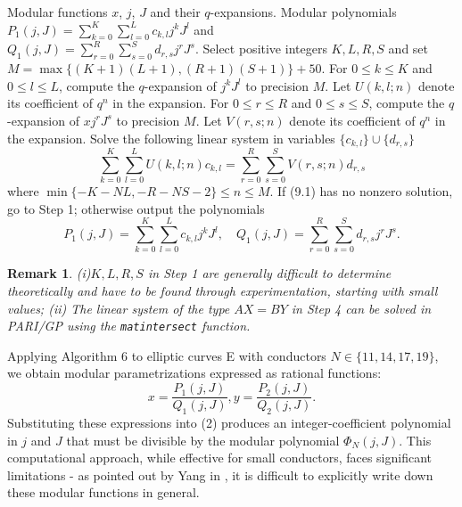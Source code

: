 \documentclass[10pt, a4paper]{article}
\newtheorem{remark}[theorem]{Remark}
\begin{document}
\begin{algorithm}[H]
\caption{Compute polynomials $P_1(j,J)$ and $Q_1(j,J)$ such that $x = \frac{P_1(j, J)}{Q_1(j, J)}$}
\begin{algorithmic}[1]
\REQUIRE  Modular functions $x$,  $j$, $J$ and their $q$-expansions.
\ENSURE Modular polynomials $P_1(j,J) = \sum_{k=0}^K \sum_{l=0}^L c_{k,l} j^k J^l$ and \\
\qquad\quad$Q_1(j,J) = \sum_{r=0}^R \sum_{s=0}^S d_{r,s} j^r J^s$.
\STATE  Select positive integers $K, L, R, S$ and set $M = \max\{(K+1)(L+1), (R+1)(S+1)\} + 50$.
\STATE For $0 \leq k \leq K$ and $0 \leq l \leq L$, compute the $q$-expansion of $j^k J^l$ to precision $M$. Let $U(k,l;n)$ denote its coefficient of $q^n$ in the expansion.
\STATE   For $0 \leq r \leq R$ and $0 \leq s \leq S$, compute the $q$-expansion of $xj^r J^s$ to precision $M$. Let $V(r,s;n)$ denote its coefficient of $q^n$ in the expansion.
\STATE  Solve the following  linear system in  variables $\{c_{k,l}\} \cup \{d_{r,s}\}$
\begin{equation}\sum_{k=0}^K \sum_{l=0}^L U(k,l;n)c_{k,l} = \sum_{r=0}^R \sum_{s=0}^S V(r,s;n)d_{r,s} \end{equation}
where $\min\{-K-NL, -R-NS-2\} \leq n \leq M$.
\STATE  If  (9.1)  has no nonzero solution, go to Step 1; otherwise
output the polynomials
\[ P_1(j,J) = \sum_{k=0}^K \sum_{l=0}^L c_{k,l} j^k J^l, \quad Q_1(j,J) = \sum_{r=0}^R \sum_{s=0}^S d_{r,s} j^r J^s. \]
\end{algorithmic}
\end{algorithm}
\begin{remark}
 (i)$K, L, R, S$  in Step 1 are generally difficult to determine theoretically and have to  be found through experimentation, starting with small values;
 (ii) The linear system of  the type $AX=BY$ in Step 4 can be solved in PARI/GP using the \texttt{matintersect} function.
\end{remark}

Applying Algorithm 6 to elliptic curves E with conductors $N \in \{11,14,17,19\}$, we obtain modular parametrizations expressed as rational functions:
\[x = \frac{P_1(j, J)}{Q_1(j, J)}, y = \frac{P_2(j, J)}{Q_2(j, J)}.\]
Substituting these expressions into (2)   produces an integer-coefficient polynomial in $j$ and $J$ that must be divisible by the modular polynomial $\Phi_N(j,J)$. This computational approach, while effective for small conductors, faces significant limitations - as pointed out  by Yang in \cite{Yang},  it is  difficult to explicitly write down these modular functions in general.
\end{document}
